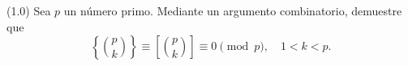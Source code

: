 
(1.0) Sea $p$ un número primo. Mediante un argumento combinatorio, demuestre que
\[
  \left\{\binom{p}{k}\right\}
  \equiv
  \left[\binom{p}{k}\right]
  \equiv 0 \pmod{p},\quad 1 < k < p.
\]
